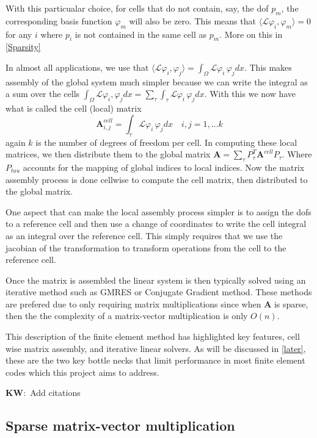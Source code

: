 \documentclass[12pt]{article}
\newcommand{\KW}[1]{{\color{blue}\textbf{KW}:~#1}}
\begin{document}
With this particualar choice, for cells that do not contain, say, the dof $p_{m}$, the corresponding basis function $\varphi_{m}$ will also be zero. This means that $\langle \mathcal{L}\varphi_{i}, \varphi_{m}\rangle = 0$ for any $i$ where $p_{i}$ is not contained in the same cell as $p_{m}$. More on this in \ref{Sparsity}

In almost all applications, we use that 
$\langle \mathcal{L}\varphi_{i}, \varphi_{j}\rangle = \int_{\Omega}\mathcal{L}\varphi_{i}\, \varphi_{j}dx $. This makes assembly of the global system much simpler because we can write the integral as a sum over the cells $ \int_{\Omega}\mathcal{L}\varphi_{i}, \varphi_{j}dx = \sum_{\tau} \int_{\tau}\mathcal{L}\varphi_{i}\, \varphi_{j}dx $. With this we now have what is called the cell (local) matrix 
$$ \mathbf{A}^{cell}_{i,j} = \int_{\tau}\mathcal{L}\varphi_{i}\, \varphi_{j}dx\quad i, j = 1, \ldots k $$ 
again $k$ is the number of degrees of freedom per cell. In computing these local matrices, we then distribute them to the global matrix $ \mathbf{A} = \sum_{\tau}P^{T}_{\tau}\mathbf{A}^{cell}P_{\tau} $. Where $P_{tau}$ accounts for the mapping of global indices to local indices. Now the matrix assembly process is done cellwise to compute the cell matrix, then distributed to the global matrix. 

One aspect that can make the local assembly process simpler is to assign the dofs to a reference cell and then use a change of coordinates to write the cell integral as an integral over the reference cell. This simply requires that we use the jacobian of the transformation to transform operations from the cell to the reference cell.

Once the matrix is assembled the linear system is then typically solved using an iterative method such as GMRES or Conjugate Gradient method. These methods are prefered due to only requiring matrix multiplications since when $\mathbf{A}$ is sparse, then the the complexity of a matrix-vector multiplication is only $O(n)$. 

This description of the finite element method has highlighted key features, cell wise matrix assembly, and iterative linear solvers. As will be discussed in \ref{later}, these are the two key bottle necks that limit performance in most finite element codes which this project aims to address. 

\KW{Add citations}


\subsection{Sparse matrix-vector multiplication}
\end{document}
